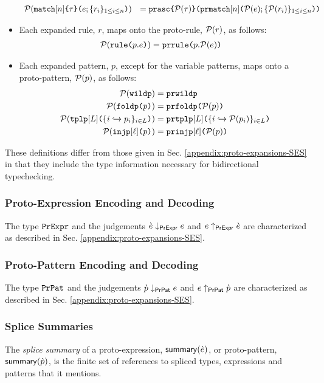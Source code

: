 \begin{itemize}
\[\begin{array}{rl}
  \mathcal{P}(\texttt{match}[n]\texttt{\{}\tau\texttt{\}(}e; \{r_{i}\}_{1 \leq i \leq n}\texttt{)}) & = \texttt{prasc}\texttt{\{}\mathcal{P}(\tau)\texttt{\}(}\texttt{prmatch}[n]\texttt{(}\mathcal{P}(e); \{\mathcal{P}(r_i)\}_{1 \leq i \leq n}\texttt{)}\texttt{)}
  \end{array}\]
  \item Each expanded rule, $r$, maps onto the proto-rule, $\mathcal{P}(r)$, as follows:
  \begin{align*}
  \mathcal{P}(\texttt{rule}\texttt{(}p.e\texttt{)}) & = \texttt{prrule}\texttt{(}p.\mathcal{P}(e)\texttt{)}
  \end{align*}
  \item Each expanded pattern, $p$, except for the variable patterns, maps onto a proto-pattern, $\mathcal{P}(p)$, as follows:
  \begin{align*}
  \mathcal{P}(\texttt{wildp}) & = \texttt{prwildp}\\
  \mathcal{P}(\texttt{foldp}\texttt{(}p\texttt{)}) & = \texttt{prfoldp}\texttt{(}\mathcal{P}(p)\texttt{)}\\
  \mathcal{P}(\texttt{tplp}[L]\texttt{(}\{i \hookrightarrow p_{i}\}_{i \in L}\texttt{)}) & = \texttt{prtplp}[L]\texttt{(}\{i \hookrightarrow \mathcal{P}(p_{i})\}_{i \in L}\texttt{)}\\
  \mathcal{P}(\texttt{injp}[\ell]\texttt{(}p\texttt{)}) & = \texttt{prinjp}[\ell]\texttt{(}\mathcal{P}(p)\texttt{)}
  \end{align*}
\end{itemize}

These definitions differ from those given in Sec. \ref{appendix:proto-expansions-SES} in that they include the type information necessary for bidirectional typechecking.

\subsubsection{Proto-Expression Encoding and Decoding}
The type $\mathtt{PrExpr}$ and the judgements $\grave{e} \downarrow_\mathsf{PrExpr} e$ and $e \uparrow_\mathsf{PrExpr} \grave{e}$ are characterized as described in Sec. \ref{appendix:proto-expansions-SES}.

\subsubsection{Proto-Pattern Encoding and Decoding}
The type $\mathtt{PrPat}$ and the judgements $\grave{p} \downarrow_\mathsf{PrPat} e$ and $e \uparrow_\mathsf{PrPat} \grave{p}$ are characterized as described in Sec. \ref{appendix:proto-expansions-SES}.

\subsubsection{Splice Summaries}
The \emph{splice summary} of a proto-expression, $\mathsf{summary}(\grave{e})$, or proto-pattern, $\mathsf{summary}(\grave{p})$, is the finite set of references to spliced types, expressions {and patterns} that it mentions.

